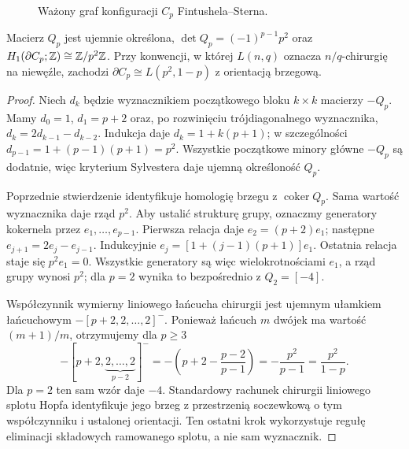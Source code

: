 \begin{figure}[htbp]
\centering
{}
\caption{Ważony graf konfiguracji $C_p$ Fintushela--Sterna.}
\label{fig:graf-cp-cztery}
\end{figure}

\begin{stwierdzenie}
\label{prop:cp-rachunek-cztery}
Macierz $Q_p$ jest ujemnie określona,
$\det Q_p=(-1)^{p-1}p^2$ oraz
$H_1(\partial C_p;\mathbb{Z})\cong\mathbb{Z}/p^2\mathbb{Z}$.
Przy konwencji, w której $L(n,q)$ oznacza
$n/q$-chirurgię na niewęźle, zachodzi
$\partial C_p\cong L(p^2,1-p)$ z orientacją brzegową.
\end{stwierdzenie}
\begin{proof}
Niech $d_k$ będzie wyznacznikiem początkowego bloku
$k\times k$ macierzy $-Q_p$. Mamy $d_0=1$,
$d_1=p+2$ oraz, po rozwinięciu trójdiagonalnego
wyznacznika, $d_k=2d_{k-1}-d_{k-2}$.
Indukcja daje $d_k=1+k(p+1)$; w szczególności
$d_{p-1}=1+(p-1)(p+1)=p^2$.
Wszystkie początkowe minory główne $-Q_p$ są dodatnie,
więc kryterium Sylvestera daje ujemną określoność $Q_p$.

Poprzednie stwierdzenie identyfikuje homologię brzegu
z $\operatorname{coker}Q_p$. Sama wartość wyznacznika
daje rząd $p^2$. Aby ustalić strukturę grupy, oznaczmy
generatory kokernela przez $e_1,\ldots,e_{p-1}$.
Pierwsza relacja daje $e_2=(p+2)e_1$; następne
$e_{j+1}=2e_j-e_{j-1}$. Indukcyjnie
$e_j=[1+(j-1)(p+1)]e_1$.
Ostatnia relacja staje się $p^2e_1=0$.
Wszystkie generatory są więc wielokrotnościami $e_1$,
a rząd grupy wynosi $p^2$; dla $p=2$ wynika to
bezpośrednio z $Q_2=[-4]$.

Współczynnik wymierny liniowego łańcucha chirurgii
jest ujemnym ułamkiem łańcuchowym
$-[p+2,2,\ldots,2]^-$.
Ponieważ łańcuch $m$ dwójek ma wartość $(m+1)/m$,
otrzymujemy dla $p\geq3$
\[
 -[p+2,\underbrace{2,\ldots,2}_{p-2}]^-
 =-\left(p+2-\frac{p-2}{p-1}\right)
 =-\frac{p^2}{p-1}=\frac{p^2}{1-p}.
\]
Dla $p=2$ ten sam wzór daje $-4$.
Standardowy rachunek chirurgii liniowego splotu Hopfa
identyfikuje jego brzeg z przestrzenią soczewkową
o tym współczynniku i ustalonej orientacji.
Ten ostatni krok wykorzystuje regułę eliminacji
składowych ramowanego splotu, a nie sam wyznacznik.
\end{proof}

